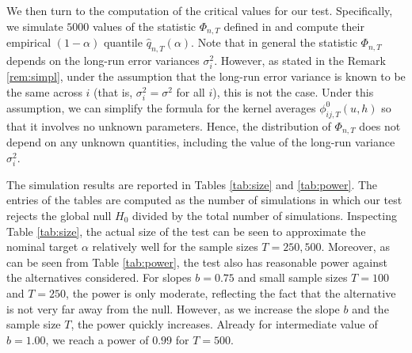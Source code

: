 \documentclass[a4paper,12pt]{article}
\makeatletter
\renewcommand{\eqref}[1]{\tagform@{\ref{#1}}}
\makeatother
\begin{document}
We then turn to the computation of the critical values for our test. Specifically, we simulate $5000$ values of the statistic $\Phi_{n,T}$ defined in \eqref{eq:Phi} and compute their empirical $(1-\alpha)$ quantile $\widehat{q}_{n,T}(\alpha)$. Note that in general the statistic $\Phi_{n,T}$ depends on the long-run error variances $\sigma_i^2$. However, as stated in the Remark \ref{rem:simpl}, under the assumption that the long-run error variance is known to be the same across $i$ (that is, $\sigma_i^2 = \sigma^2$ for all $i$), this is not the case. Under this assumption, we can simplify the formula for the kernel averages $\phi^0_{ij, T}(u, h)$ so that it involves no unknown parameters. Hence, the distribution of $\Phi_{n, T}$ does not depend on any unknown quantities, including the value of the long-run variance $\sigma_i^2$.

%
%
The simulation results are reported in Tables \ref{tab:size} and \ref{tab:power}. The entries of the tables are computed as the number of simulations in which our test rejects the global null $H_0$ divided by the total number of simulations. Inspecting Table \ref{tab:size}, the actual size of the test can be seen to approximate the nominal target $\alpha$ relatively well for the sample sizes $T = 250, 500$.%
Moreover, as can be seen from Table \ref{tab:power}, the test also has reasonable power against the alternatives considered. For slopes $b=0.75$ and small sample sizes $T = 100$ and $T = 250$, the power is only moderate, reflecting the fact that the alternative is not very far away from the null. However, as we increase the slope $b$ and the sample size $T$, the power quickly increases. Already for intermediate value of $b = 1.00$, we reach a power of $0.99$ for $T = 500$.
\end{document}
